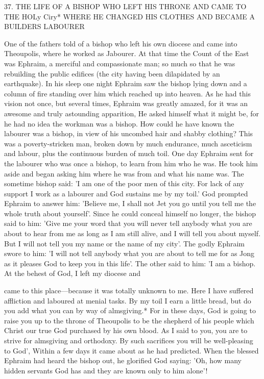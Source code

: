 37. THE LIFE OF A BISHOP WHO LEFT
HIS THRONE AND CAME TO THE HOLy Ciry*
WHERE HE CHANGED HIS CLOTHES AND
BECAME A BUILDER\textquotesingle S LABOURER

One of the fathers told of a bishop who left his own diocese and
came into Theoupolis, where he worked as Jabourer. At that time
the Count of the East was Ephraim, a merciful and compassionate
man; so much so that he was rebuilding the public edifices (the city
having been dilapidated by an earthquake). In his sleep one night
Ephraim saw the bishop lying down and a column of fire standing
over him which reached up into heaven. As he had this vision not
once, but several times, Ephraim was greatly amazed, for it was an
awesome and truly astounding apparition, He asked himself what
it might be, for he had no idea the workman was a bishop. How
could he have known the labourer was a bishop, in view of his
uncombed hair and shabby clothing? This was a poverty-stricken
man, broken down by much endurance, much asceticism and
labour, plus the continuous burden of much toil. One day Ephraim
sent for the labourer who was once a bishop, to learn from him who
he was. He took him aside and began asking him where he was
from and what his name was. The sometime bishop said: 'I am one
of the poor men of this city. For lack of any support I work as a
labourer and God sustains me by my toil.' God prompted Ephraim
to answer him: 'Believe me, I shall not Jet you go until you tell me
the whole truth about yourself'. Since he could conceal himself no
longer, the bishop said to him: 'Give me your word that you will
never tell anybody what you are about to hear from me as long as
I am still alive, and I will tell you about myself. But I will not tell
you my name or the name of my city'. The godly Ephraim swore to
him: 'I will not tell anybody what you are about to tell me for as
Jong as it pleases God to keep you in this life'. The other said to
him: 'I am a bishop. At the behest of God, I left my diocese and

came to this place—because it was totally unknown to me. Here I
have suffered affliction and laboured at menial tasks. By my toil I
earn a little bread, but do you add what you can by way of
almsgiving.* For in these days, God is going to raise you up to the
throne of Theoupolis to be the shepherd of his people which Christ
our true God purchased by his own blood. As I said to you, you are
to strive for almsgiving and orthodoxy. By such sacrifices you will
be well-pleasing to God', Within a few days it came about as he had
predicted. When the blessed Ephraim had heard the bishop out, he
glorified God saying: 'Oh, how many hidden servants God has and
they are known only to him alone'!

